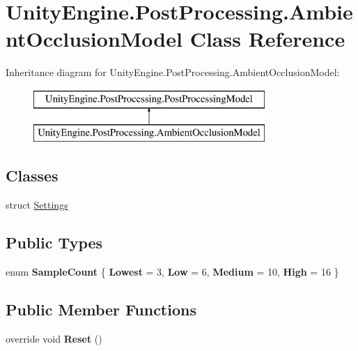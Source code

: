 \hypertarget{class_unity_engine_1_1_post_processing_1_1_ambient_occlusion_model}{}\section{Unity\+Engine.\+Post\+Processing.\+Ambient\+Occlusion\+Model Class Reference}
\label{class_unity_engine_1_1_post_processing_1_1_ambient_occlusion_model}
Inheritance diagram for Unity\+Engine.\+Post\+Processing.\+Ambient\+Occlusion\+Model\+:\begin{figure}[H]
\begin{center}
\leavevmode
\includegraphics[height=2.000000cm]{class_unity_engine_1_1_post_processing_1_1_ambient_occlusion_model}
\end{center}
\end{figure}
\subsection*{Classes}
\begin{DoxyCompactItemize}
\item 
struct \hyperlink{struct_unity_engine_1_1_post_processing_1_1_ambient_occlusion_model_1_1_settings}{Settings}
\end{DoxyCompactItemize}
\subsection*{Public Types}
\begin{DoxyCompactItemize}
\item 
\mbox{\label{class_unity_engine_1_1_post_processing_1_1_ambient_occlusion_model_abdde0f4c8184e60edc0466c88c55140f}} 
enum {\bfseries Sample\+Count} \{ {\bfseries Lowest} = 3, 
{\bfseries Low} = 6, 
{\bfseries Medium} = 10, 
{\bfseries High} = 16
 \}
\end{DoxyCompactItemize}
\subsection*{Public Member Functions}
\begin{DoxyCompactItemize}
\item 
\mbox{\label{class_unity_engine_1_1_post_processing_1_1_ambient_occlusion_model_acd50412ffa1f482d1d7561c48cc7f731}} 
override void {\bfseries Reset} ()
\end{DoxyCompactItemize}
